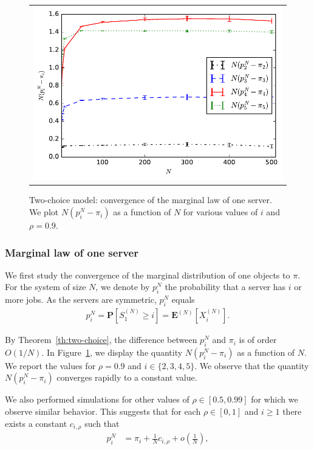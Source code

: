 \documentclass[sigconf]{acmart}
\newcommand\SN{S^{(N)}}
\newcommand\XN{X^{(N)}}
\newcommand\espN[1]{\mathbf{E}^{(N)}\left[#1\right]}
\newcommand\sProba[1]{\mathbf{P}[#1]}
\newcommand\p[1]{\left(#1\right)}
\begin{document}
\begin{figure}[t]
  \centering
  \begin{tabular}{@{}c@{}}
    \includegraphics[width=\linewidth]{2choice_convergence_rho90}\\
  \end{tabular}
  \caption{Two-choice model: convergence of the marginal law of one
    server. We plot $N(p^N_i-\pi_i)$ as a function of $N$ for various
    values of $i$ and $\rho=0.9$. }
  \label{fig:2-choice_x}
\end{figure}

\subsubsection{Marginal law of one server}

We first study the convergence of the marginal distribution of one
objects to $\pi$. For the system of size $N$, we denote by $p^N_i$ the
probability that a server has $i$ or more jobs. As the servers are
symmetric, $p^N_i$ equals
\begin{align*}
  p^N_i=\sProba{\SN_1\ge i} = \espN{\XN_i}. 
\end{align*}

By Theorem~\ref{th:two-choice}, the difference between $p^N_i$ and
$\pi_i$ is of order $O(1/N)$. In Figure~\ref{fig:2-choice_x}, we
display the quantity $N(p^N_i-\pi_i)$ as a function of $N$. We report
the values for $\rho=0.9$ and $i\in\{2,3,4,5\}$. We observe that the
quantity $N(p^N_i-\pi_i)$ converges rapidly to a constant value. 

We also performed simulations for other values of $\rho\in[0.5,0.99]$
for which we observe similar behavior.  This suggests that for each
$\rho\in[0,1]$ and $i\ge1$ there exists a constant $c_{i,\rho}$ such
that
\begin{align}
  \label{eq:c_i_rho}
  p^N_i&=\pi_i + \frac1N c_{i,\rho} + o\p{\frac1N},
\end{align}
\end{document}
